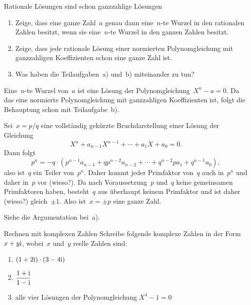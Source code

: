 \documentclass{algblatt}
\begin{document}
\begin{aufgabe}{Rationale Lösungen sind schon ganzzahlige Lösungen}
\begin{enumerate}
  \item Zeige, dass eine ganze Zahl~$a$ genau dann eine~$n$-te Wurzel in den
  rationalen Zahlen besitzt, wenn sie eine~$n$-te Wurzel in den ganzen Zahlen
  besitzt.
  \item Zeige, dass jede rationale Lösung einer normierten Polynomgleichung mit
  ganzzahligen Koeffizienten schon eine ganze Zahl ist.
  \item Was haben die Teilaufgaben~a) und~b) miteinander zu tun?
\end{enumerate}
\begin{loesungE}
\item Eine~$n$-te Wurzel von~$a$ ist eine Lösung der Polynomgleichung~$X^n - a
= 0$. Da das eine normierte Polynomgleichung mit ganzzahligen Koeffizienten
ist, folgt die Behauptung schon mit Teilaufgabe~b).
\item Sei~$x = p/q$ eine vollständig gekürzte Bruchdarstellung einer Lösung der
Gleichung
\[ X^n + a_{n-1} X^{n-1} + \cdots + a_1 X + a_0 = 0. \]
Dann folgt
\[ p^n = -q \cdot (p^{n-1} a_{n-1} + q p^{n-2} a_{n-2} + \cdots + q^{n-2} p
a_1 + q^{n-1} a_0), \]
also ist~$q$ ein Teiler von~$p^n$. Daher kommt jeder Primfaktor von~$q$ auch
in~$p^n$ und daher in~$p$ vor (wieso?). Da nach Voraussetzung~$p$ und~$q$ keine
gemeinsamen Primfaktoren haben, besteht~$q$ aus überhaupt keinem Primfaktor und
ist daher (wieso?) gleich~$\pm1$. Also ist~$x = \pm p$ eine ganze Zahl.
\item Siehe die Argumentation bei~a).
\end{loesungE}
\end{aufgabe}

\begin{aufgabe}{Rechnen mit komplexen Zahlen}
Schreibe folgende komplexe Zahlen in der Form~$x + y \mathrm{i}$, wobei~$x$ und~$y$
reelle Zahlen sind:
\begin{enumerate}
\item $(1 + 2 \mathrm{i}) \cdot (3 - 4 \mathrm{i})$
\item $\dfrac{1 + \mathrm{i}}{1 - \mathrm{i}}$
\item alle vier Lösungen der Polynomgleichung $X^4 - 1 = 0$
\end{enumerate}
\end{aufgabe}
\end{document}
